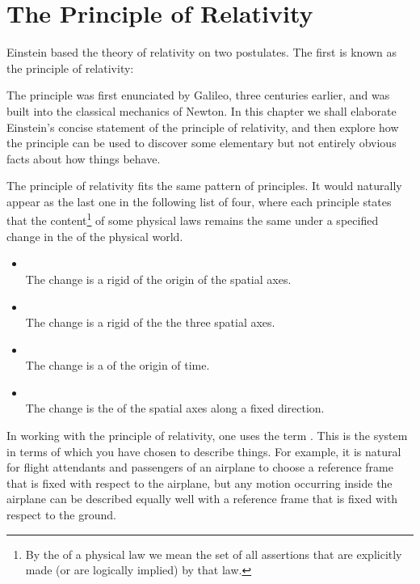 \chapter{The Principle of Relativity}
\label{ch:Morin_01}
Einstein based the theory of relativity on two postulates. 
The first is known as the principle of relativity:\\

The principle was first enunciated by Galileo, three centuries earlier, and was built into the classical mechanics of Newton. In this chapter we shall elaborate Einstein's concise statement of the principle of relativity, and then explore how the principle can be used to discover some elementary but not entirely obvious facts about how things behave. 

The principle of relativity fits the same pattern of  principles. It would naturally appear as the last one in the following list of four, where each principle states that the content\footnote{By the  of a physical law we mean the set of all assertions that are explicitly made (or are logically implied) by that law.} of some physical laws remains the same under a specified change in the  of the physical world.  

\begin{itemize}[noitemsep,topsep=0pt]
\item {}\\
The change is a rigid  of the origin of the spatial axes.
\item {}\\
The change is a rigid  of the the three spatial axes.
\item {}\\
The change is a  of the origin of time.
\item {}\\
The change is the  of the spatial axes along a fixed direction.
\end{itemize}

In working with the principle of relativity, one uses the term . This is the system in terms of which you have chosen to describe things. For example, it is natural for flight attendants and passengers of an airplane to choose a reference frame that is fixed with respect to the airplane, but any motion occurring inside the airplane can be described equally well with a reference frame that is fixed with respect to the ground. 

